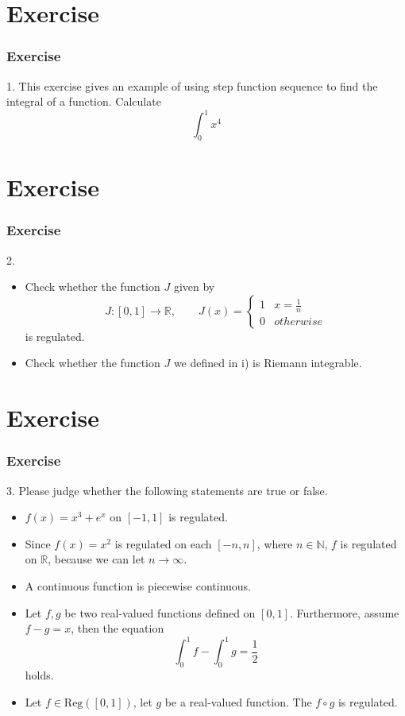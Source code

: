 \documentclass[12pt, t]{beamer}
\begin{document}
\section{Exercise}
\begin{frame}
    \frametitle{Exercise}
1. This exercise gives an example of using step function sequence to find the integral of a function. Calculate
\begin{equation*}
    \int_0^1x^4
\end{equation*}
\end{frame}

\section{Exercise}
\begin{frame}
    \frametitle{Exercise}
2. 
\begin{itemize}
    \item Check whether the function $J$ given by 
    \begin{equation*}
        J:[0,1]\rightarrow\mathbb{R}, \qquad J(x)=
    \begin{cases}
        1 & x=\frac{1}{n}\\
        0 & otherwise    
    \end{cases}
    \end{equation*} 
    is regulated.\\
    \vspace{1em}
    \item Check whether the function $J$ we defined in i) is Riemann integrable.
\end{itemize}
\end{frame}

\section{Exercise}
\begin{frame}
    \frametitle{Exercise}
3. Please judge whether the following statements are true or false.
\begin{itemize}
    \item $f(x)=x^3+e^x$ on $[-1,1]$ is regulated.
    \item Since $f(x)=x^2$ is regulated on each $[-n,n]$, where $n\in\mathbb{N}$, $f$ is regulated on $\mathbb{R}$, because we can let $n\rightarrow\infty$.
    \item A continuous function is piecewise continuous.
    \item Let $f,g$ be two real-valued functions defined on $[0,1]$. Furthermore, assume $f-g=x$, then the equation \begin{equation*}
        \int_0^1f-\int_0^1g=\frac{1}{2}
    \end{equation*} holds.
    \item Let $f\in\text{Reg}([0,1])$, let $g$ be a real-valued function. The $f\circ g$ is regulated.
\end{itemize}
\end{frame}
\end{document}
